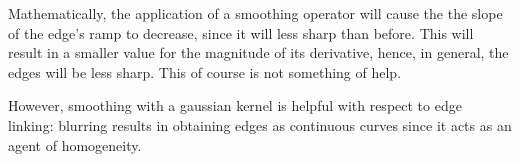 Mathematically, the application of a smoothing operator will cause the the
slope of the edge's ramp to decrease, since it will less sharp than before.
This will result in a smaller value for the magnitude of its derivative,
hence, in general, the edges will be less sharp. This of course is not something
of help.

However, smoothing with a gaussian kernel is helpful with respect to edge
linking: blurring results in obtaining edges as continuous curves since it
acts as an agent of homogeneity.
